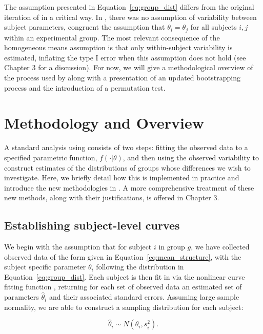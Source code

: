 The assumption presented in Equation~\ref{eq:group_dist} differs from the original iteration of  in a critical way. In \cite{oleson2017detecting}, there was no assumption of variability between subject parameters, congruent the assumption that $\theta_i = \theta_j$ for all subjects $i, j$ within an experimental group. The most relevant consequence of the homogeneous means assumption is that only within-subject variability is estimated, inflating the type I error when this assumption does not hold (see Chapter 3 for a discussion). For now, we will give a methodological overview of the process used by  along with a presentation of an updated bootstrapping process and the introduction of a permutation test.




\section{Methodology and Overview} 

A standard analysis using  consists of two steps: fitting the observed data to a specified parametric function, $f(\cdot|\theta)$, and then using the observed variability to construct estimates of the distributions of groups whose differences we wish to investigate.  Here, we briefly detail how this is implemented in practice and introduce the new methodologies in . A more comprehensive treatment of these new methods, along with their justifications, is offered in Chapter 3. 



\subsection{Establishing subject-level curves }

We begin with the assumption that for subject $i$ in group $g$, we have collected observed data of the form given in Equation~\ref{eq:mean_structure}, with the subject specific parameter $\theta_i$ following the distribution in Equation~\ref{eq:group_dist}. Each subject is then fit in  via the nonlinear curve fitting function , returning for each set of observed data an estimated set of parameters $\hat{\theta}_i$ and their associated standard errors. Assuming large sample normality, we are able to construct a sampling distribution for each subject:

\begin{equation}\label{eq:sub_dist}
\hat{\theta}_i \sim N(\theta_i, s_i^2).
\end{equation}

